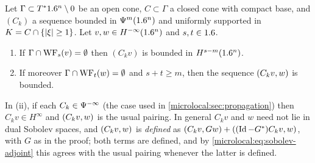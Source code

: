 \begin{lemma}\label{microlocal:lem:uniform-bounds}
  Let $\Gamma\subset T^*1.6^n\setminus0$ be an open cone, $C\subset\Gamma$ a closed cone
  with compact base, and $(C_k)$ a sequence bounded in $\Psi^{m}(1.6^n)$ and
  uniformly supported in $K=C\cap\{\lvert \xi\rvert\ge1\}$. Let $v,w\in H^{-\infty}(1.6^n)$
  and $s,t\in1.6$.
  \begin{enumerate}[label=\textup{(\roman*)}]
  \item If $\Gamma\cap\operatorname{WF}_s(v)=\emptyset$ then $(C_kv)$ is bounded in
    $H^{s-m}(1.6^n)$.
  \item If moreover $\Gamma\cap\operatorname{WF}_t(w)=\emptyset$ and $s+t\ge m$, then the
    sequence $( C_kv, w)$ is bounded.
  \end{enumerate}
  In (ii), if each $C_k\in\Psi^{-\infty}$ (the case used in
  \cref{microlocal:sec:propagation}) then $C_kv\in H^\infty$ and
  $( C_kv, w)$ is the usual pairing. In general $C_kv$ and $w$ need not lie
  in dual Sobolev spaces, and $( C_kv, w)$ is \emph{defined} as
  $( C_kv, Gw)+( (\operatorname{Id}-G^*)C_kv, w)$, with $G$ as in the proof; both
  terms are defined, and by \eqref{microlocal:eq:sobolev-adjoint} this
  agrees with the usual pairing whenever the latter is defined.
\end{lemma}
